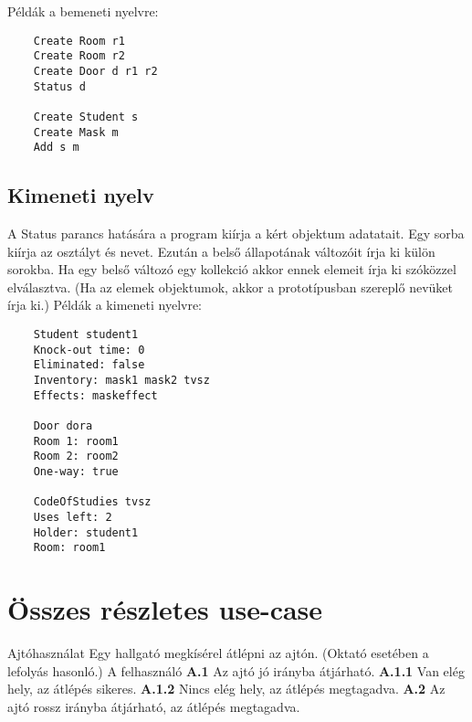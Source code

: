 Példák a bemeneti nyelvre:
\begin{verbatim}
    Create Room r1
    Create Room r2
    Create Door d r1 r2
    Status d

    Create Student s
    Create Mask m
    Add s m
\end{verbatim}


\subsection{Kimeneti nyelv}

A Status parancs hatására a program kiírja a kért objektum adatatait. Egy sorba kiírja az osztályt és nevet. Ezután a belső állapotának változóit írja ki külön sorokba. Ha egy belső változó egy kollekció akkor ennek elemeit írja ki szóközzel elválasztva. (Ha az elemek objektumok, akkor a prototípusban szereplő nevüket írja ki.) \newline Példák a kimeneti nyelvre:

\begin{verbatim}
    Student student1
    Knock-out time: 0
    Eliminated: false
    Inventory: mask1 mask2 tvsz
    Effects: maskeffect

    Door dora
    Room 1: room1
    Room 2: room2
    One-way: true

    CodeOfStudies tvsz
    Uses left: 2
    Holder: student1
    Room: room1
\end{verbatim}

\section{Összes részletes use-case}
\begin{use-case}
    {Ajtóhasználat}
    {Egy hallgató megkísérel átlépni az ajtón. (Oktató esetében a lefolyás hasonló.)}
    {A felhasználó}
    \textbf{A.1} Az ajtó jó irányba átjárható.
    \newline\textbf{A.1.1} Van elég hely, az átlépés sikeres.
    \newline\textbf{A.1.2} Nincs elég hely, az átlépés megtagadva.
    \newline\textbf{A.2} Az ajtó rossz irányba átjárható, az átlépés megtagadva.
\end{use-case}

